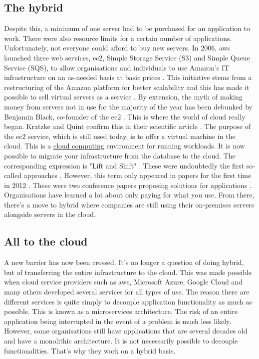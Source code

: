 \subsection{The hybrid}
Despite this, a minimum of one server had to be purchased for an application to work. There were also resource limits for a certain number of applications. Unfortunately, not everyone could afford to buy new servers. In 2006, \gls{aws} launched three web services, \acrfull{ec2}, Simple Storage Service (S3) and Simple Queue Service (SQS), to allow organisations and individuals to use Amazon's IT infrastructure on an as-needed basis at basic prices \cite{evaluation_aws_services}. This initiative stems from a restructuring of the Amazon platform for better scalability and this has made it possible to sell virtual servers as a service \cite{ec2_origins}. By extension, the myth of making money from servers not in use for the majority of the year has been debunked by Benjamin Black, co-founder of the \acrshort{ec2} \cite{ec2_origins}. This is where the world of \gls{cloud} really began. Kratzke and Quint confirm this in their scientific article \cite{understanding_cloud_native}. The purpose of the \acrshort{ec2} service, which is still used today, is to offer a virtual machine in the \gls{cloud}. This is a \hyperref[subsec:cloudcomputing]{cloud computing} environment for running workloads. It is now possible to migrate your infrastructure from the database to the \gls{cloud}. The corresponding expression is "Lift and Shift" \cite{ibm_lifAndShift}. These were undoubtedly the first so-called  approaches \cite{history_cloud_native}. However, this term only appeared in papers for the first time in 2012 \cite{understanding_cloud_native}. These were two conference papers proposing solutions for  applications \cite{closer12, 4caast}. Organisations have learned a lot about only paying for what you use. From there, there's a move to hybrid where companies are still using their on-premises servers alongside servers in the \gls{cloud}. \cite{history_cloud_native}

\subsection{All to the \texorpdfstring{\gls{cloud}}{}}
A new barrier has now been crossed. It's no longer a question of doing hybrid, but of transferring the entire infrastructure to the \gls{cloud}. This was made possible when \gls{cloud} service providers such as \gls{aws}, Microsoft Azure, Google Cloud and many others developed several services for all types of use. The reason there are different services is quite simply to decouple application functionality as much as possible. This is known as a microservices architecture. The risk of an entire application being interrupted in the event of a problem is much less likely. However, some organisations still have applications that are several decades old and have a monolithic architecture. It is not necessarily possible to decouple functionalities. That's why they work on a hybrid basis. \cite{history_cloud_native}

